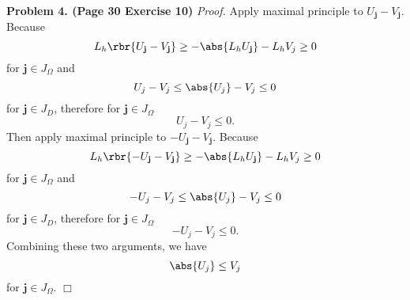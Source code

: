 \documentclass[english, nochinese]{pnote}
\begin{document}
\textbf{Problem 4. (Page 30 Exercise 10)} \textit{Proof.} Apply maximal principle to $ U_{\mathbf{j}} - V_{\mathbf{j}} $. Because
\begin{equation}
L_h \rbr{ U_{\mathbf{j}} - V_{\mathbf{j}} } \ge -\abs{ L_h U_{\mathbf{j}} } - L_h V_j \ge 0
\end{equation}
for $ \mathbf{j} \in J_{\Omega} $ and
\begin{equation}
U_j - V_j \le \abs{U_j} - V_j \le 0
\end{equation}
for $ \mathbf{j} \in J_D $,
therefore for $ \mathbf{j} \in J_{\Omega} $
\begin{equation}
U_j - V_j \le 0.
\end{equation}
Then apply maximal principle to $ -U_{\mathbf{j}} - V_{\mathbf{j}} $. Because
\begin{equation}
L_h \rbr{ -U_{\mathbf{j}} - V_{\mathbf{j}} } \ge -\abs{ L_h U_{\mathbf{j}} } - L_h V_j \ge 0
\end{equation}
for $ \mathbf{j} \in J_{\Omega} $ and
\begin{equation}
-U_j - V_j \le \abs{U_j} - V_j \le 0
\end{equation}
for $ \mathbf{j} \in J_D $,
therefore for $ \mathbf{j} \in J_{\Omega} $
\begin{equation}
-U_j - V_j \le 0.
\end{equation}
Combining these two arguments, we have
\begin{equation}
\abs{U_j} \le V_j
\end{equation}
for $ \mathbf{j} \in J_{\Omega} $.
\hfill$\Box$
\end{document}
